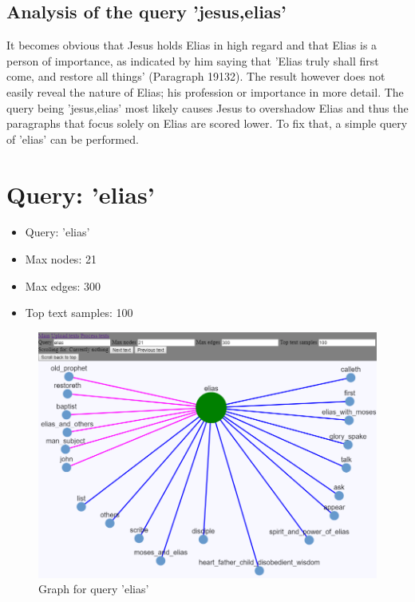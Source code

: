\subsection{Analysis of the query 'jesus,elias'}
It becomes obvious that Jesus holds Elias in high regard and that Elias is a person of importance, as indicated by him saying that 'Elias truly shall first come, and restore all things' (Paragraph 19132). The result however does not easily reveal the nature of Elias; his profession or importance in more detail. The query being 'jesus,elias' most likely causes Jesus to overshadow Elias and thus the paragraphs that focus solely on Elias are scored lower. To fix that, a simple query of 'elias' can be performed.

%
%
%
%
\clearpage
\section{Query: 'elias'}
\label{sec:query_elias}
\begin{itemize}
    \item Query: 'elias'
    \item Max nodes: 21
    \item Max edges: 300
    \item Top text samples: 100
\end{itemize}
\begin{figure}[H]
    \centering
    \includegraphics[scale=0.8]{fig/elias}
    \caption{Graph for query 'elias'}
    \label{fig:query_elias}
\end{figure}

\clearpage
